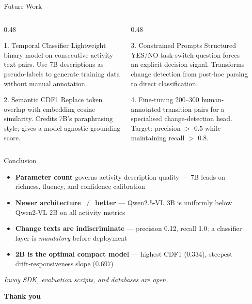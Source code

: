 \documentclass[10pt, aspectratio=169]{beamer}
\begin{document}
\begin{frame}{Future Work}
  \begin{columns}[T]
    \begin{column}{0.48\textwidth}
      \begin{block}{1. Temporal Classifier}
        Lightweight binary model on consecutive activity text pairs.
        Use 7B descriptions as pseudo-labels to generate training data without manual annotation.
      \end{block}
      \vspace{0.4em}
      \begin{block}{2. Semantic CDF1}
        Replace token overlap with embedding cosine similarity.
        Credits 7B's paraphrasing style; gives a model-agnostic grounding score.
      \end{block}
    \end{column}
    \begin{column}{0.48\textwidth}
      \begin{block}{3. Constrained Prompts}
        Structured YES/NO task-switch question forces an explicit decision signal.
        Transforms change detection from post-hoc parsing to direct classification.
      \end{block}
      \vspace{0.4em}
      \begin{block}{4. Fine-tuning}
        200–300 human-annotated transition pairs for a specialised change-detection head.
        Target: precision $>$ 0.5 while maintaining recall $>$ 0.8.
      \end{block}
    \end{column}
  \end{columns}
\end{frame}

\begin{frame}{Conclusion}
  \begin{itemize}
    \setlength\itemsep{0.55em}
    \item \textbf{Parameter count} governs activity description quality — \textcolor{col7b}{7B} leads on richness, fluency, and confidence calibration
    \item \textbf{Newer architecture $\neq$ better} — Qwen2.5-VL \textcolor{col3b}{3B} is uniformly below Qwen2-VL \textcolor{col2b}{2B} on all activity metrics
    \item \textbf{Change texts are indiscriminate} — precision 0.12, recall 1.0; a classifier layer is \emph{mandatory} before deployment
    \item \textcolor{col2b}{\textbf{2B is the optimal compact model}} — highest CDF1 (0.334), steepest drift-responsiveness slope (0.697)
  \end{itemize}
  \vspace{1em}
  \begin{center}
    \textit{Invoy SDK, evaluation scripts, and databases are open.}
  \end{center}
  \vspace{0.4em}
  \begin{center}
    \large\textbf{Thank you}
  \end{center}
\end{frame}
\end{document}
